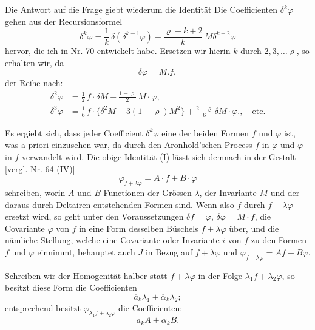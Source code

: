 Die Antwort auf die Frage giebt wiederum die Identität
Die Coefficienten $\delta^k\varphi$ gehen aus der Recursionsformel
\[
\delta^k\varphi = \frac{1}{k}\,\delta(\delta^{k-1}\varphi) - \frac{\varrho-k+2}{k}\,M\delta^{k-2}\varphi
\]
hervor, die ich in Nr. 70 entwickelt habe. Ersetzen wir hierin $k$ durch $2, 3, \dots \varrho$, so erhalten wir, da
\[
\delta\varphi = M.f,
\]
der Reihe nach:
\[
\begin{aligned}
\delta^2\varphi &= \frac{1}{2}\,f\cdot\delta M + \frac{1-\varrho}{2}\,M\cdot\varphi,\\
\delta^3\varphi &= \frac{1}{6}\,f\cdot\{\delta^2 M + 3(1-\varrho)M^2\} + \frac{2-\varrho}{6}\,\delta M\cdot\varphi., \quad \text{etc.}
\end{aligned}
\]

Es ergiebt sich, dass jeder Coefficient $\delta^k\varphi$ eine  der beiden Formen $f$ und $\varphi$ ist, was a priori einzusehen war, da durch den Aronhold'schen Process $f$ in $\varphi$ und $\varphi$ in $f$ verwandelt wird. Die obige Identität (I) lässt sich demnach in der Gestalt [vergl. Nr. 64 (IV)]
\[
\varphi_{f+\lambda\varphi} = A\cdot f + B\cdot\varphi
\]
schreiben, worin $A$ und $B$ Functionen der Grössen $\lambda$, der Invariante $M$ und der daraus durch Deltairen entstehenden Formen sind. Wenn also $f$ durch $f+\lambda\varphi$ ersetzt wird, so geht unter den Voraussetzungen $\delta f=\varphi$, $\delta\varphi=M\cdot f$, die Covariante $\varphi$ von $f$ in eine Form desselben Büschels $f+\lambda\varphi$ über, und die nämliche Stellung, welche eine Covariante oder Invariante $i$ von $f$ zu den Formen $f$ und $\varphi$ einnimmt, behauptet auch $J$ in Bezug auf $f+\lambda\varphi$ und $\varphi_{f+\lambda\varphi}=Af+B\varphi$.

Schreiben wir der Homogenität halber statt $f+\lambda\varphi$ in der Folge $\lambda_1 f+\lambda_2\varphi$, so besitzt diese Form die Coefficienten
\[
\overline a_k\lambda_1 + \overline\alpha_k\lambda_2;
\]
entsprechend besitzt $\varphi_{\lambda_1 f+\lambda_2\varphi}$ die Coefficienten:
\[
\overline a_k A + \overline\alpha_k B.
\]


